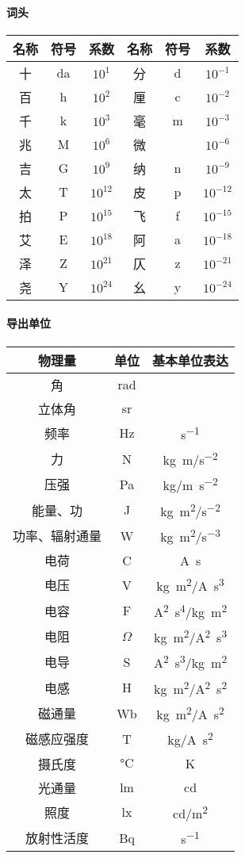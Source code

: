 \paragraph{词头}
\begin{center}
	\begin{tabular}{ccc|ccc}
		\toprule
		名称&符号&系数&名称&符号&系数\\
		\midrule
		十&da&$10^1$&分&d&$10^{-1}$\\
		百&h&$10^2$&厘&c&$10^{-2}$\\
		千&k&$10^3$&毫&m&$10^{-3}$\\
		兆&M&$10^6$&微&\si{\micro}&$10^{-6}$\\
		吉&G&$10^9$&纳&n&$10^{-9}$\\
		太&T&$10^{12}$&皮&p&$10^{-12}$\\
		拍&P&$10^{15}$&飞&f&$10^{-15}$\\
		艾&E&$10^{18}$&阿&a&$10^{-18}$\\
		泽&Z&$10^{21}$&仄&z&$10^{-21}$\\
		尧&Y&$10^{24}$&幺&y&$10^{-24}$\\
		\bottomrule
	\end{tabular}
\end{center}
\paragraph{导出单位}
\begin{center}
	\begin{tabular}{ccc}
		\toprule
		物理量&单位&基本单位表达\\
		\midrule
		角&rad&\\
		立体角&sr&\\
		频率&Hz&\si{s^{-1}}\\
		力&N&\si{kg.m/s^{-2}}\\
		压强&Pa&\si{kg/m.s^{-2}}\\
		能量、功&J&\si{kg.m^2/s^{-2}}\\
		功率、辐射通量&W&\si{kg.m^2/s^{-3}}\\
		电荷&C&\si{A.s}\\
		电压&V&\si{kg.m^2/A.s^3}\\
		电容&F&\si{A^2.s^4/kg.m^2}\\
		电阻&$\Omega$&\si{kg.m^2/A^2.s^3}\\
		电导&S&\si{A^2.s^3/kg.m^2}\\
		电感&H&\si{kg.m^2/A^2.s^2}\\
		磁通量&Wb&\si{kg.m^2/A.s^2}\\
		磁感应强度&T&\si{kg/A.s^2}\\
		摄氏度&$\si{\degreeCelsius}$&K\\
		光通量&lm&cd\\
		照度&lx&\si{cd/m^2}\\
		放射性活度&Bq&\si{s^{-1}}\\
		\bottomrule
	\end{tabular}
\end{center}
